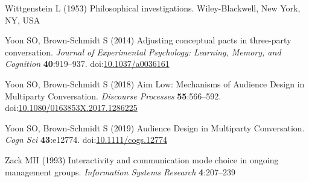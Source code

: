 \documentclass[
  english,
]{article}
\newlength{\cslhangindent}
\newlength{\cslentryspacingunit} %
\newenvironment{CSLReferences}[2] %
 {%
  \setlength{\parindent}{0pt}
  \ifodd #1
  \let\oldpar\par
  \def\par{\hangindent=\cslhangindent\oldpar}
  \fi
  \setlength{\parskip}{#2\cslentryspacingunit}
 }%
 {}
\begin{document}
\begin{CSLReferences}{1}{0}
\leavevmode{}%
Wittgenstein L (1953) Philosophical investigations. Wiley-Blackwell, New York, NY, USA

\leavevmode{}%
Yoon SO, Brown-Schmidt S (2014) Adjusting conceptual pacts in three-party conversation. \emph{Journal of Experimental Psychology: Learning, Memory, and Cognition} \textbf{40}:919--937. doi:\href{https://doi.org/10.1037/a0036161}{10.1037/a0036161}

\leavevmode{}%
Yoon SO, Brown-Schmidt S (2018) Aim {Low}: {Mechanisms} of {Audience Design} in {Multiparty Conversation}. \emph{Discourse Processes} \textbf{55}:566--592. doi:\href{https://doi.org/10.1080/0163853X.2017.1286225}{10.1080/0163853X.2017.1286225}

\leavevmode{}%
Yoon SO, Brown‐Schmidt S (2019) Audience {Design} in {Multiparty Conversation}. \emph{Cogn Sci} \textbf{43}:e12774. doi:\href{https://doi.org/10.1111/cogs.12774}{10.1111/cogs.12774}

\leavevmode{}%
Zack MH (1993) Interactivity and communication mode choice in ongoing management groups. \emph{Information Systems Research} \textbf{4}:207--239

\end{CSLReferences}
\end{document}
